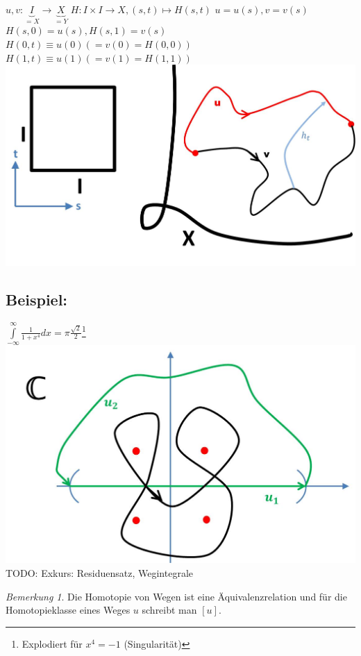\documentclass[a4paper,11pt,notitlepage]{report}
\theoremstyle{remark}
\newtheorem{remark}{Bemerkung}[chapter]
\theoremstyle{definition}
\newenvironment{bsp}[1]
{
\setlength{\fboxsep}{10pt}
\subsection*{Beispiel: #1}
\begin{upshape}
}
{
\end{upshape}
}
\begin{document}
$u,v \colon \underbrace{I}_{= X} \rightarrow \underbrace{X}_{=Y}$ \newline
$H \colon I \times I \rightarrow X, (s,t) \mapsto H(s,t)$ \newline
$u = u(s), v= v(s)$ \newline
$H(s,0) = u(s), H(s,1)=v(s)$ \newline
$H(0,t) \equiv u(0) (=v(0) = H(0,0))$ \newline
$H(1,t) \equiv u(1) (=v(1) = H(1,1))$ \newline
\includegraphics[scale=0.4]{images/Homotopie_Menge_von_Wegen.jpg}

\begin{bsp}{}
	$\int\limits_{-\infty}^{\infty}{\frac{1}{1+x^4} dx} = \pi \frac{\sqrt{2}}{2}$\footnote{Explodiert für $x^4 = -1$ (Singularität)}
	\includegraphics[scale=0.4]{images/Residuensatz.jpg}
	\newline
	TODO: Exkurs: Residuensatz, Wegintegrale
\end{bsp}

\begin{remark}{}
	Die Homotopie von Wegen ist eine Äquivalenzrelation und für die Homotopieklasse eines Weges $u$ schreibt man $[u]$.
\end{remark}
\end{document}
